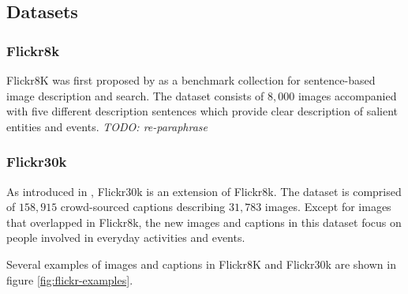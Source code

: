 \subsection{Datasets}
\subsubsection{Flickr8k}
Flickr8K was first proposed by \cite{Hodosh:2013:FID:2566972.2566993} as a benchmark collection for sentence-based image description and search. The dataset consists of $8,000$ images accompanied with five different description sentences which provide clear description of salient entities and events. \textit{TODO: re-paraphrase}
\subsubsection{Flickr30k}
As introduced in \cite{DBLP:journals/tacl/YoungLHH14}, Flickr30k is an extension of Flickr8k. The dataset is comprised of $158,915$ crowd-sourced captions describing $31,783$ images. Except for images that overlapped in Flickr8k, the new images and captions in this dataset focus on people involved in everyday activities and events.

Several examples of images and captions in Flickr8K and Flickr30k are shown in figure \ref{fig:flickr-examples}.

